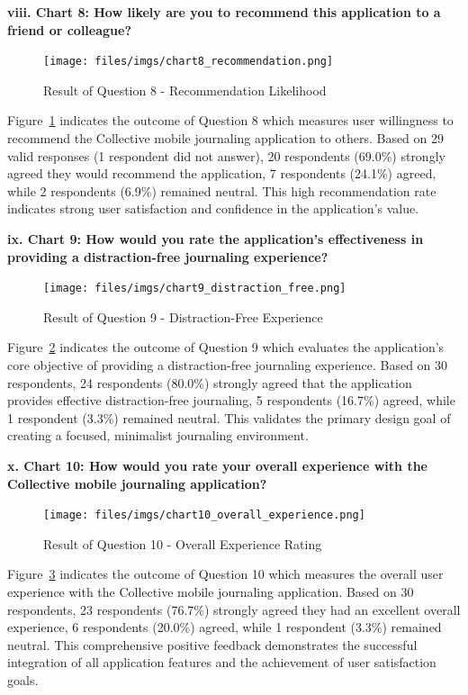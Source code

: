 \textbf{viii. Chart 8: How likely are you to recommend this application to a friend or colleague?}

\begin{figure}[H]
\centering
\texttt{[image: files/imgs/chart8\_recommendation.png]}
\caption{Result of Question 8 - Recommendation Likelihood}
\label{fig:chart8-recommend}
\end{figure}

Figure~\ref{fig:chart8-recommend} indicates the outcome of Question 8 which measures user willingness to recommend the Collective mobile journaling application to others. Based on 29 valid responses (1 respondent did not answer), 20 respondents (69.0\%) strongly agreed they would recommend the application, 7 respondents (24.1\%) agreed, while 2 respondents (6.9\%) remained neutral. This high recommendation rate indicates strong user satisfaction and confidence in the application's value.

\textbf{ix. Chart 9: How would you rate the application's effectiveness in providing a distraction-free journaling experience?}

\begin{figure}[H]
\centering
\texttt{[image: files/imgs/chart9\_distraction\_free.png]}
\caption{Result of Question 9 - Distraction-Free Experience}
\label{fig:chart9-distraction}
\end{figure}

Figure~\ref{fig:chart9-distraction} indicates the outcome of Question 9 which evaluates the application's core objective of providing a distraction-free journaling experience. Based on 30 respondents, 24 respondents (80.0\%) strongly agreed that the application provides effective distraction-free journaling, 5 respondents (16.7\%) agreed, while 1 respondent (3.3\%) remained neutral. This validates the primary design goal of creating a focused, minimalist journaling environment.

\textbf{x. Chart 10: How would you rate your overall experience with the Collective mobile journaling application?}

\begin{figure}[H]
\centering
\texttt{[image: files/imgs/chart10\_overall\_experience.png]}
\caption{Result of Question 10 - Overall Experience Rating}
\label{fig:chart10-overall}
\end{figure}

Figure~\ref{fig:chart10-overall} indicates the outcome of Question 10 which measures the overall user experience with the Collective mobile journaling application. Based on 30 respondents, 23 respondents (76.7\%) strongly agreed they had an excellent overall experience, 6 respondents (20.0\%) agreed, while 1 respondent (3.3\%) remained neutral. This comprehensive positive feedback demonstrates the successful integration of all application features and the achievement of user satisfaction goals.

